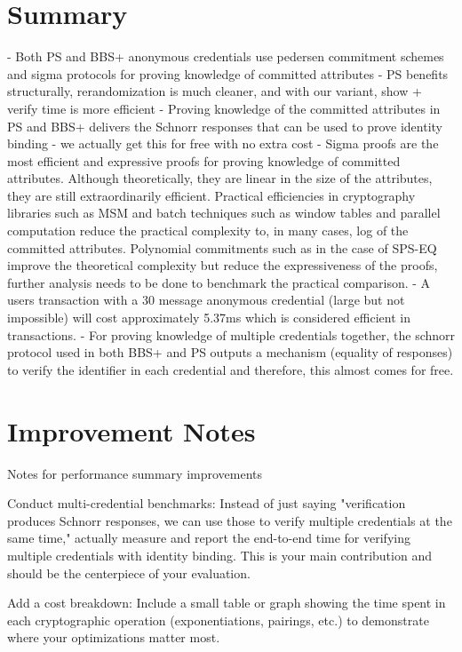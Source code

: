 \section{Summary}
- Both PS and BBS+ anonymous credentials use pedersen commitment schemes and sigma protocols for proving knowledge of committed attributes
- PS benefits structurally, rerandomization is much cleaner, and with our variant, show + verify time is more efficient
- Proving knowledge of the committed attributes in PS and BBS+ delivers the Schnorr responses that can be used to prove identity binding - we actually get this for free with no extra cost
- Sigma proofs are the most efficient and expressive proofs for proving knowledge of committed attributes. Although theoretically, they are linear in the size of the attributes, they are still extraordinarily efficient. Practical efficiencies in cryptography libraries such as MSM and batch techniques such as window tables and parallel computation reduce the practical complexity to, in many cases, log of the committed attributes. Polynomial commitments such as in the case of SPS-EQ improve the theoretical complexity but reduce the expressiveness of the proofs, further analysis needs to be done to benchmark the practical comparison. 
- A users transaction with a 30 message anonymous credential (large but not impossible) will cost approximately 5.37ms which is considered efficient in transactions. 
- For proving knowledge of multiple credentials together, the schnorr protocol used in both BBS+ and PS outputs a mechanism (equality of responses) to verify the identifier in each credential and therefore, this almost comes for free. 









\section{Improvement Notes}
Notes for performance summary improvements

Conduct multi-credential benchmarks: Instead of just saying "verification produces Schnorr responses, we can use those to verify multiple credentials at the same time," actually measure and report the end-to-end time for verifying multiple credentials with identity binding. This is your main contribution and should be the centerpiece of your evaluation.

Add a cost breakdown: Include a small table or graph showing the time spent in each cryptographic operation (exponentiations, pairings, etc.) to demonstrate where your optimizations matter most.


